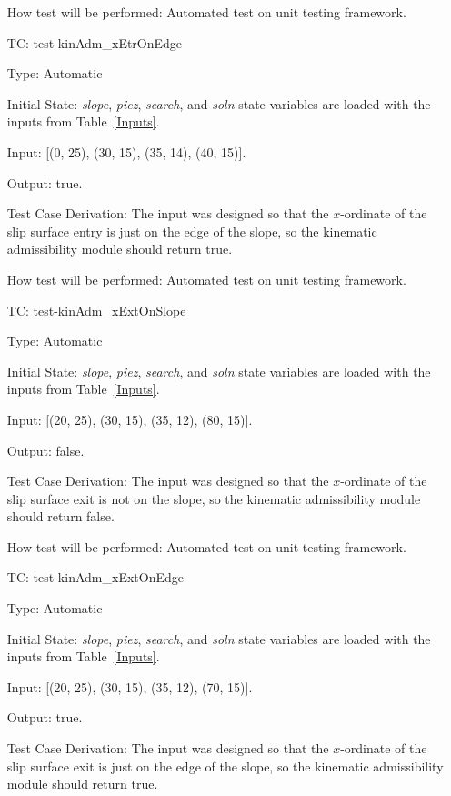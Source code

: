 \documentclass[12pt, titlepage]{article}
\newcounter{utestnum} %
\begin{document}
\begin{enumerate}[label=TC\arabic*:,ref={\arabic*}]
	How test will be performed: Automated test on unit testing framework.
	
	\item [TC\refstepcounter{utestnum}\theutestnum: 
	\label{TC_KinAdmXetrOnEdge}] 
	test-kinAdm\_xEtrOnEdge
	
	Type: Automatic
	
	Initial State: \textit{slope}, \textit{piez}, \textit{search}, and 
	\textit{soln} state variables are loaded with the inputs from 
	Table~\ref{Inputs}.
	
	Input: [(0, 25), (30, 15), (35, 14), (40, 15)].
	
	Output: true.
	
	Test Case Derivation: The input was designed so that the $x$-ordinate of 
	the slip surface entry is just on the edge of the slope, so the kinematic 
	admissibility module should return true.
	
	How test will be performed: Automated test on unit testing framework.
	
	\item [TC\refstepcounter{utestnum}\theutestnum: 
	\label{TC_KinAdmXextOnSlope}] 
	test-kinAdm\_xExtOnSlope
	
	Type: Automatic
	
	Initial State: \textit{slope}, \textit{piez}, \textit{search}, and 
	\textit{soln} state variables are loaded with the inputs from 
	Table~\ref{Inputs}.
	
	Input: [(20, 25), (30, 15), (35, 12), (80, 15)].
	
	Output: false.
	
	Test Case Derivation: The input was designed so that the $x$-ordinate of 
	the slip surface exit is not on the slope, so the kinematic admissibility 
	module should return false.
	
	How test will be performed: Automated test on unit testing framework.
	
	\item [TC\refstepcounter{utestnum}\theutestnum: 
	\label{TC_KinAdmXextOnEdge}] 
	test-kinAdm\_xExtOnEdge
	
	Type: Automatic
	
	Initial State: \textit{slope}, \textit{piez}, \textit{search}, and 
	\textit{soln} state variables are loaded with the inputs from 
	Table~\ref{Inputs}.
	
	Input: [(20, 25), (30, 15), (35, 12), (70, 15)].
	
	Output: true.
	
	Test Case Derivation: The input was designed so that the $x$-ordinate of 
	the slip surface exit is just on the edge of the slope, so the kinematic 
	admissibility module should return true.
	

\end{enumerate}
\end{document}
